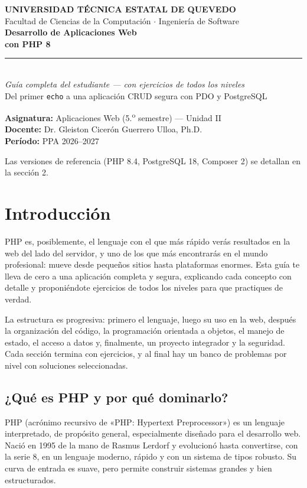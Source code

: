 \documentclass[11pt]{article}
\begin{document}
\begin{titlepage}
\vspace*{1.2cm}
{\color{phpazul}\bfseries\large UNIVERSIDAD T\'ECNICA ESTATAL DE QUEVEDO}\\[2pt]
{\color{gray} Facultad de Ciencias de la Computaci\'on $\cdot$ Ingenier\'ia de Software}\\[2.2cm]
{\color{tinta}\bfseries\fontsize{30}{34}\selectfont Desarrollo de Aplicaciones Web}\\[6pt]
{\color{phpazul}\bfseries\fontsize{30}{34}\selectfont con PHP 8}\\[10pt]
{\color{phporo}\rule{\linewidth}{2.2pt}}\\[10pt]
{\itshape\large Gu\'ia completa del estudiante --- con ejercicios de todos los niveles}\\[4pt]
{\color{gray} Del primer \texttt{echo} a una aplicaci\'on CRUD segura con PDO y PostgreSQL}\\[3cm]
\begin{flushleft}
\textbf{Asignatura:} Aplicaciones Web (5.\textsuperscript{o} semestre) --- Unidad II\\[3pt]
\textbf{Docente:} Dr. Gleiston Cicer\'on Guerrero Ulloa, Ph.D.\\[3pt]
\textbf{Per\'iodo:} PPA 2026--2027
\end{flushleft}
\vfill
{\color{gray}\small Las versiones de referencia (PHP 8.4, PostgreSQL 18, Composer 2) se detallan en la secci\'on 2.}
\end{titlepage}
\tableofcontents
\clearpage
\section{Introducción}
PHP es, posiblemente, el lenguaje con el que más rápido verás resultados en la web del lado del servidor, y uno de los que más encontrarás en el mundo profesional: mueve desde pequeños sitios hasta plataformas enormes. Esta guía te lleva de cero a una aplicación completa y segura, explicando cada concepto con detalle y proponiéndote ejercicios de todos los niveles para que practiques de verdad.

La estructura es progresiva: primero el lenguaje, luego su uso en la web, después la organización del código, la programación orientada a objetos, el manejo de estado, el acceso a datos y, finalmente, un proyecto integrador y la seguridad. Cada sección termina con ejercicios, y al final hay un banco de problemas por nivel con soluciones seleccionadas.

\subsection{¿Qué es PHP y por qué dominarlo?}
PHP (acrónimo recursivo de «PHP: Hypertext Preprocessor») es un lenguaje interpretado, de propósito general, especialmente diseñado para el desarrollo web. Nació en 1995 de la mano de Rasmus Lerdorf y evolucionó hasta convertirse, con la serie 8, en un lenguaje moderno, rápido y con un sistema de tipos robusto. Su curva de entrada es suave, pero permite construir sistemas grandes y bien estructurados.
\end{document}
